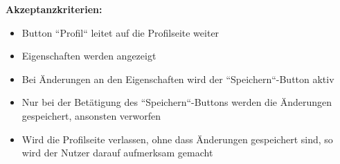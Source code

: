 \documentclass[conference]{IEEEtran}
\begin{document}
	\textbf{Akzeptanzkriterien:}
	\begin{itemize}
		\item Button ``Profil`` leitet auf die Profilseite weiter
		\item Eigenschaften werden angezeigt
		\item Bei Änderungen an den Eigenschaften wird der ``Speichern``-Button aktiv
		\item Nur bei der Betätigung des ``Speichern``-Buttons werden die Änderungen gespeichert, ansonsten verworfen
		\item Wird die Profilseite verlassen, ohne dass Änderungen gespeichert sind, so wird der Nutzer darauf aufmerksam gemacht
	\end{itemize}
	
\end{document}
